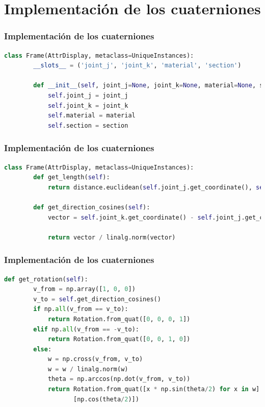 \documentclass{beamer}
\begin{document}
\section{Implementación de los cuaterniones}
\begin{frame}[fragile]
  \frametitle{Implementación de los cuaterniones}

  \begin{lstlisting}[language=Python]
    class Frame(AttrDisplay, metaclass=UniqueInstances):
        __slots__ = ('joint_j', 'joint_k', 'material', 'section')

        def __init__(self, joint_j=None, joint_k=None, material=None, section=None):
            self.joint_j = joint_j
            self.joint_k = joint_k
            self.material = material
            self.section = section
  \end{lstlisting}
\end{frame}

\begin{frame}[fragile]
  \frametitle{Implementación de los cuaterniones}

  \begin{lstlisting}[language=Python]
    class Frame(AttrDisplay, metaclass=UniqueInstances):
        def get_length(self):
            return distance.euclidean(self.joint_j.get_coordinate(), self.joint_k.get_coordinate())

        def get_direction_cosines(self):
            vector = self.joint_k.get_coordinate() - self.joint_j.get_coordinate()

            return vector / linalg.norm(vector)
  \end{lstlisting}
\end{frame}

\begin{frame}[fragile]
  \frametitle{Implementación de los cuaterniones}
 
  \begin{lstlisting}[language=Python]
    def get_rotation(self):
        v_from = np.array([1, 0, 0])
        v_to = self.get_direction_cosines()
        if np.all(v_from == v_to):
            return Rotation.from_quat([0, 0, 0, 1])
        elif np.all(v_from == -v_to):
            return Rotation.from_quat([0, 0, 1, 0])
        else:
            w = np.cross(v_from, v_to)
            w = w / linalg.norm(w)
            theta = np.arccos(np.dot(v_from, v_to))
            return Rotation.from_quat([x * np.sin(theta/2) for x in w] +
                   [np.cos(theta/2)])
  \end{lstlisting}
\end{frame}
\end{document}
